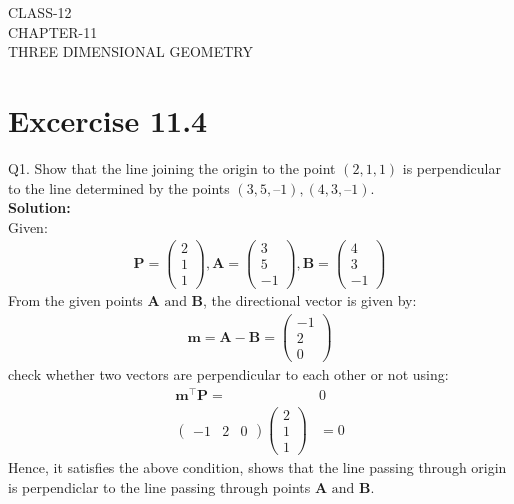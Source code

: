 \documentclass[12pt]{article}
\newcommand{\solution}{\noindent \textbf{Solution: }}
\newcommand{\myvec}[1]{\ensuremath{\begin{pmatrix}#1\end{pmatrix}}}
\let\vec\mathbf
\begin{document}
\begin{center}
\textbf\large{CLASS-12 \\ CHAPTER-11 \\ THREE DIMENSIONAL GEOMETRY}
\end{center}
\section*{Excercise 11.4}

Q1. Show that the line joining the origin to the point $(2, 1, 1)$ is perpendicular to the
line determined by the points $(3, 5, – 1), (4, 3, – 1)$.
\\
\solution
\\
Given:
\begin{align}
  \vec{P}=\myvec{2\\1\\1},\vec{A}=\myvec{3\\5\\-1},\vec{B}=\myvec{4\\3\\-1}
\end{align}
From the given points $\vec{A}\text{ and }\vec{B}$, the directional vector is given by:
		\begin{align}
	\vec{m}=\vec{A}-\vec{B}=\myvec{-1\\2\\0}
		\end{align}
			 check whether two vectors are perpendicular to each other or not using:
		\begin{align}
			\vec{m}^\top\vec{P}=&0\\
			\myvec{-1&2&0}\myvec{2\\1\\1}&=0
		\end{align}
				Hence, it satisfies the above condition, shows that the line passing through origin is perpendiclar to the line passing through points $\vec{A} \text{ and } \vec{B}$.
		
\end{document}
